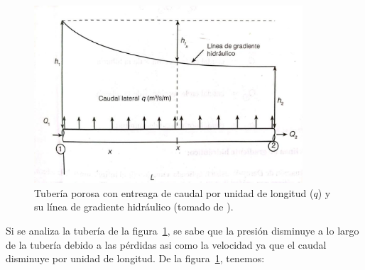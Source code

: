 \documentclass[11pt, oneside]{article}
\begin{document}
\begin{figure}[h]
\centering
\includegraphics[width=10cm]{./figs/porot.jpeg}
\caption{Tuber\'ia porosa con entreaga de caudal por unidad de longitud ($q$) y su l\'inea de gradiente hidr\'aulico (tomado de \cite{saldarriaga}).} 
\label{porot}
\end{figure}
Si se analiza la tuber\'ia de la figura~\ref{porot}, se sabe que la presi\'on disminuye a lo largo de la tuber\'ia debido a las p\'erdidas asi como la velocidad ya que el caudal disminuye por unidad de longitud. De la figura~\ref{porot}, tenemos:
\end{document}
